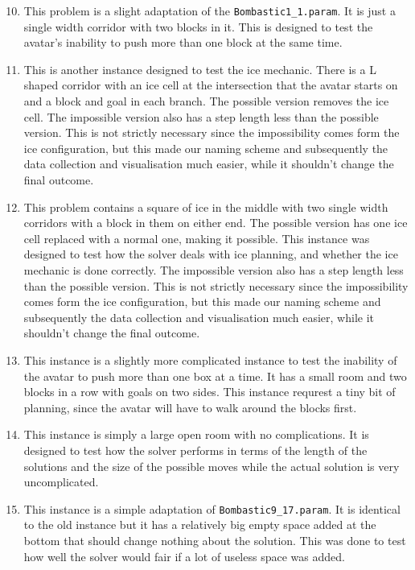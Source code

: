 \documentclass[british]{article}
\newcommand{\code}[1]{\texttt{#1}}
\begin{document}
\begin{enumerate}[1)]
	\setcounter{enumi}{9}
	\item This problem is a slight adaptation of the \code{Bombastic1\_1.param}. It is just a single width corridor with two blocks in it. This is designed to test the avatar's inability to push more than one block at the same time.
	\item This is another instance designed to test the ice mechanic. There is a L shaped corridor with an ice cell at the intersection that the avatar starts on and a block and goal in each branch. The possible version removes the ice cell. The impossible version also has a step length less than the possible version. This is not strictly necessary since the impossibility comes form the ice configuration, but this made our naming scheme and subsequently the data collection and visualisation much easier, while it shouldn't change the final outcome.
	\item This problem contains a square of ice in the middle with two single width corridors with a block in them on either end. The possible version has one ice cell replaced with a normal one, making it possible. This instance was designed to test how the solver deals with ice planning, and whether the ice mechanic is done correctly. The impossible version also has a step length less than the possible version. This is not strictly necessary since the impossibility comes form the ice configuration, but this made our naming scheme and subsequently the data collection and visualisation much easier, while it shouldn't change the final outcome.
	\item This instance is a slightly more complicated instance to test the inability of the avatar to push more than one box at a time. It has a small room and two blocks in a row with goals on two sides. This instance requrest a tiny bit of planning, since the avatar will have to walk around the blocks first.
	\item This instance is simply a large open room with no complications. It is designed to test how the solver performs in terms of the length of the solutions and the size of the possible moves while the actual solution is very uncomplicated.
	\item  This instance is a simple adaptation of \code{Bombastic9\_17.param}.  It is identical to the old instance but it has a relatively big empty space added at the bottom that should change nothing about the solution. This was done to test how well the solver would fair if a lot of useless space was added.
\end{enumerate}
	
\end{document}

